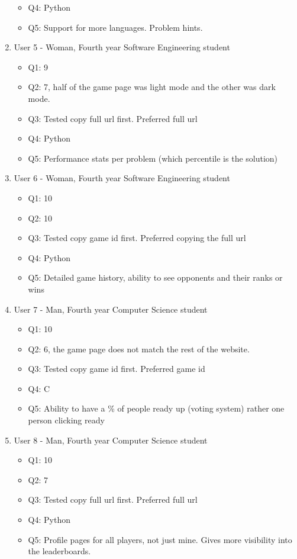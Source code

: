 \documentclass[12pt, titlepage]{article}
\begin{document}
\begin{enumerate}
\begin{itemize}
        \item Q4: Python
        \item Q5: Support for more languages. Problem hints.
    \end{itemize}
    \item User 5 - Woman, Fourth year Software Engineering student
    \begin{itemize}
        \item Q1: 9
        \item Q2: 7, half of the game page was light mode and the other was dark mode.
        \item Q3: Tested copy full url first. Preferred full url
        \item Q4: Python
        \item Q5: Performance stats per problem (which percentile is the solution)
    \end{itemize}
    \item User 6 - Woman, Fourth year Software Engineering student
    \begin{itemize}
        \item Q1: 10
        \item Q2: 10
        \item Q3: Tested copy game id first. Preferred copying the full url
        \item Q4: Python
        \item Q5: Detailed game history, ability to see opponents and their ranks or wins
    \end{itemize}
    \item User 7 - Man, Fourth year Computer Science student
    \begin{itemize} 
        \item Q1: 10
        \item Q2: 6, the game page does not match the rest of the website. 
        \item Q3: Tested copy game id first. Preferred game id
        \item Q4: C
        \item Q5: Ability to have a \% of people ready up (voting system) rather one person clicking ready
    \end{itemize}
    \item User 8 - Man, Fourth year Computer Science student
    \begin{itemize}
        \item Q1: 10
        \item Q2: 7 
        \item Q3: Tested copy full url first. Preferred full url
        \item Q4: Python
        \item Q5: Profile pages for all players, not just mine. Gives more visibility into the leaderboards.
    \end{itemize}
\end{enumerate}
\end{document}
